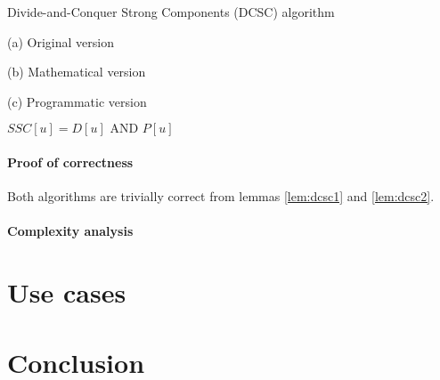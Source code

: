 \documentclass{report}[a4paper]
\theoremstyle{remark}
\begin{document}
\begin{center}
    \begin{algorithm}[H]
        \caption{Divide-and-Conquer Strong Components (DCSC) algorithm}
        \label{alg-dcsc}
        \begin{minipage}[t]{0.49\linewidth}
            (a) Original version
            \begin{algorithmic}[1]
                     
                     
                     
                    \State {}
                \EndFunction
            \end{algorithmic}
        \end{minipage}
        \begin{minipage}[t]{0.49\linewidth}
            (b) Mathematical version
            \begin{algorithmic}[1]
                     
                     
                    \State {}
                \EndFunction
            \end{algorithmic}
            (c) Programmatic version
            \begin{algorithmic}[1]
                     
                     
                     {$SSC[u] = D[u] \text{ AND } P[u]$}
                    \EndFor
                    \State {}
                \EndFunction
            \end{algorithmic}
        \end{minipage}
    \end{algorithm}
\end{center}
\subsubsection{Proof of correctness}
Both algorithms are trivially correct from lemmas \ref{lem:dcsc1} and \ref{lem:dcsc2}.
\subsubsection{Complexity analysis}
\chapter{Use cases}
\chapter{Conclusion}


\end{document}
